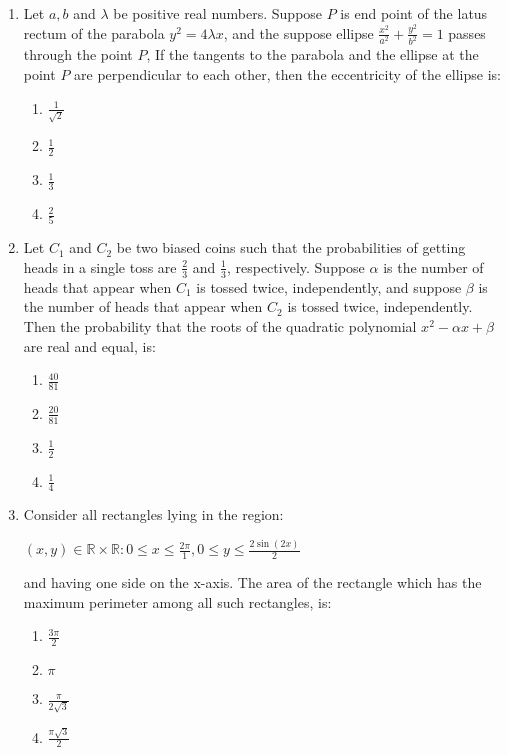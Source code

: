 \documentclass{article}
\begin{document}
\begin{enumerate}
\item   Let $a, b$ and $\lambda$ be positive real numbers. Suppose $P$ is end point of the latus rectum of the parabola $y^2 = 4\lambda x$, and the suppose ellipse $\frac{x^2}{a^2} + \frac{y^2}{b^2} = 1$ passes through the point $P$, If the tangents to the parabola and the ellipse at the point $P$ are perpendicular to each other, then the eccentricity of the ellipse is:

    \begin{enumerate}
        \item  $\frac{1}{\sqrt{2}}$
        \item  $\frac{1}{2}$
        \item  $\frac{1}{3}$
        \item  $\frac{2}{5}$
    \end{enumerate}

\item    Let $C_1$ and $C_2$ be two biased coins such that the probabilities of getting heads in a single toss are $\frac{2}{3}$ and $\frac{1}{3}$, respectively. Suppose $\alpha$ is the number of heads that appear when $C_1$ is tossed twice, independently, and suppose $\beta$ is the number of heads that appear when $C_2$ is tossed twice, independently. Then the probability that the roots of the quadratic polynomial $x^2 - \alpha x +\beta$ are real and equal, is:

    \begin{enumerate}
        \item  $\frac{40}{81}$
        \item  $\frac{20}{81}$
        \item  $\frac{1}{2}$
        \item  $\frac{1}{4}$
    \end{enumerate}

\item   Consider all rectangles lying in the region:

\begin{center}
	$ {(x,y) \in \mathbb{R} \times \mathbb{R} : 0 \leq x \leq \frac{2\pi} 1, 0 \leq y \leq \frac{2\sin(2x)}{2}}$
\end{center}

    and having one side on the x-axis. The area of the rectangle which has the maximum perimeter among all such rectangles, is:

    \begin{enumerate}
        \item  $\frac{3\pi}{2}$
        \item  $\pi$
        \item  $\frac{\pi}{2\sqrt{3}}$
        \item  $\frac{\pi\sqrt{3}}{2}$
    \end{enumerate}


\end{enumerate}
\end{document}
